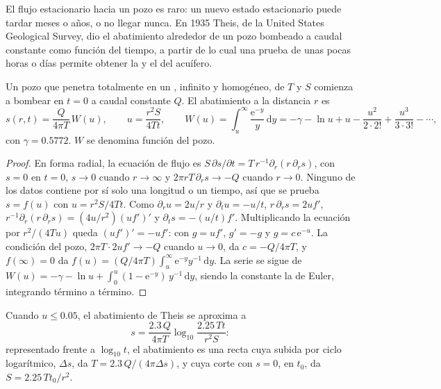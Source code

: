 El flujo estacionario hacia un pozo es raro: un nuevo estado estacionario puede tardar meses o
años, o no llegar nunca. En 1935 Theis, de la United States Geological
Survey, dio el abatimiento alrededor de un pozo bombeado a caudal constante como
función del tiempo, a partir de lo cual una prueba de unas pocas horas o días permite obtener la
 y el  del acuífero.

\begin{theorem}\label{thm:b3:hydrogeology:theis}
Un pozo que penetra totalmente en un , infinito y homogéneo, de
 $T$ y  $S$ comienza a bombear en $t = 0$ a
caudal constante $Q$. El abatimiento a la distancia $r$ es
\[
s(r, t) = \frac{Q}{4\pi T}\,W(u), \qquad u = \frac{r^2S}{4Tt}, \qquad
W(u) = \int_u^\infty\frac{\mathrm e^{-y}}{y}\,\mathrm dy = -\gamma - \ln u +
u - \frac{u^2}{2\cdot2!} + \frac{u^3}{3\cdot3!} - \cdots,
\]
con $\gamma = \num{0.5772}$. $W$ se denomina función del pozo.
\end{theorem}

\begin{proof}
En forma radial, la ecuación de flujo es $S\,\partial s/\partial t =
T\,r^{-1}\partial_r(r\,\partial_rs)$, con $s = 0$ en $t = 0$, $s \to 0$ cuando
$r \to \infty$ y $2\pi rT\,\partial_rs \to -Q$ cuando $r \to 0$. Ninguno de los
datos contiene por sí solo una longitud o un tiempo, así que se prueba $s = f(u)$ con $u =
r^2S/4Tt$. Como $\partial_ru = 2u/r$ y $\partial_tu = -u/t$, $r\,\partial_rs =
2uf'$, $r^{-1}\partial_r(r\,\partial_rs) = (4u/r^2)(uf')'$ y $\partial_ts =
-(u/t)f'$. Multiplicando la ecuación por $r^2/(4Tu)$ queda $(uf')' = -uf'$:
con $g = uf'$, $g' = -g$ y $g = c\,\mathrm e^{-u}$. La condición del pozo, $2\pi T\cdot2uf' \to -Q$ cuando $u \to 0$, da $c =
-Q/4\pi T$, y $f(\infty) = 0$ da $f(u) = (Q/4\pi T)\int_u^\infty
\mathrm e^{-y}y^{-1}\,\mathrm dy$. La serie se sigue de
$W(u) = -\gamma - \ln u + \int_0^u(1 - \mathrm e^{-y})\,y^{-1}\,\mathrm dy$,
siendo la constante la de Euler, integrando término a término.
\end{proof}

\begin{proposition}\label{prop:b3:hydrogeology:cooper-jacob}
Cuando $u \le 0.05$, el abatimiento de Theis se aproxima a
\[
s = \frac{2.3\,Q}{4\pi T}\log_{10}\frac{2.25\,Tt}{r^2S} :
\]
representado frente a $\log_{10}t$, el abatimiento es una recta cuya subida por
ciclo logarítmico, $\Delta s$, da $T = 2.3\,Q/(4\pi\Delta s)$, y cuya
corte con $s = 0$, en $t_0$, da $S = 2.25\,Tt_0/r^2$.
\end{proposition}

